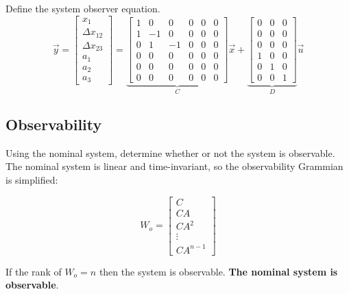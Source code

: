 \documentclass[12pt,onecolumn,reqno]{amsart}
\begin{document}
Define the system observer equation.
\begin{equation}
  \vec{y} = 
  \begin{bmatrix}
    x_{1}             \\
    \Delta x_{12}     \\
    \Delta x_{23}     \\
    a_{1}             \\
    a_{2}             \\
    a_{3}             
  \end{bmatrix}
  =
  \underbrace{
  \begin{bmatrix}
    1 & 0 & 0 & 0 & 0 & 0   \\
    1 & -1 & 0 & 0 & 0 & 0  \\
    0 & 1 & -1 & 0 & 0 & 0  \\
    0 & 0 & 0 & 0 & 0 & 0   \\
    0 & 0 & 0 & 0 & 0 & 0   \\
    0 & 0 & 0 & 0 & 0 & 0  
  \end{bmatrix}
  }_{C}
  \vec{x}
  +
  \underbrace{
  \begin{bmatrix}
    0 & 0 & 0 \\
    0 & 0 & 0 \\
    0 & 0 & 0 \\
    1 & 0 & 0 \\
    0 & 1 & 0 \\
    0 & 0 & 1
  \end{bmatrix}
  }_{D}
  \vec{u}
\end{equation}

\subsection{Observability}
Using the nominal system, determine whether or not the system is observable. The
nominal system is linear and time-invariant, so the observability Grammian is
simplified:

\begin{equation}
  W_{o} = 
  \begin{bmatrix}
    C      \\
    CA     \\
    CA^2   \\
    \vdots \\
    CA^{n-1}
  \end{bmatrix}
\end{equation}

If the rank of $W_{o} = n$ then the system is observable. \textbf{The nominal
system is observable}.
\end{document}
